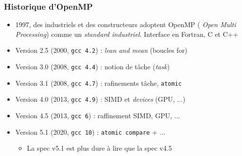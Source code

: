 \documentclass{beamer}
\begin{document}
\begin{frame}
  \frametitle{Historique d'OpenMP}
\begin{itemize}


\item 1997, des industriels et des constructeurs adoptent OpenMP ({\it
    Open Multi Processing}) comme un \emph{standard
    industriel}. Interface en Fortran, C et C++


\item Version 2.5 (2000, \texttt{gcc 4.2}) : \emph{lean and mean} (boucles for)

\item Version 3.0 (2008, \texttt{gcc 4.4}) : notion de tâche ({\it task}) 

\item Version 3.1 (2008, \texttt{gcc 4.7}) : rafinements tâche, \texttt{atomic}

\item Version 4.0 (2013, \texttt{gcc 4.9}) : SIMD et \emph{devices} (GPU, ...)

\item Version 4.5 (2013, \texttt{gcc 6}) : raffinement SIMD, GPU, ...

\item Version 5.1 (2020, \texttt{gcc 10}) : \texttt{atomic compare} + ...
  \begin{itemize}
  \item La spec v5.1 est plus dure à lire que la spec v4.5
  \end{itemize}
\end{itemize}

\end{frame}
\end{document}
